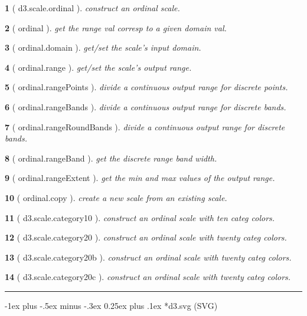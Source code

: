 \documentclass[10pt,landscape,letterpaper]{article}
\makeatletter
\newcounter{thm}
\newcommand{\hdrule}{\vspace{-4pt} \hdashrule[0.25ex]{\fill}{.5pt}{1pt}\vspace{-4pt}}
\theoremstyle{mytheoremstyle}
\newtheorem*{thm}{}
\renewcommand{\section}{\@startsection{section}{1}{0mm}%
                                {-1ex plus -.5ex minus -.3ex}%
                                {0.25ex plus .1ex}%
                                {\normalfont\large\bfseries}}
\makeatother
\begin{document}
\begin{multicols}{3}
\begin{thm} [ d3.scale.ordinal ]  construct an ordinal scale.
\end{thm}\begin{thm} [ ordinal ]  get the range val corresp to a given domain val.
\end{thm}\begin{thm} [ ordinal.domain ]  get/set the scale's input domain.
\end{thm}\begin{thm} [ ordinal.range ]  get/set the scale's output range.
\end{thm}\begin{thm} [ ordinal.rangePoints ]  divide a continuous output range for discrete points.
\end{thm}\begin{thm} [ ordinal.rangeBands ]  divide a continuous output range for discrete bands.
\end{thm}\begin{thm} [ ordinal.rangeRoundBands ]  divide a continuous output range for discrete bands.
\end{thm}\begin{thm} [ ordinal.rangeBand ]  get the discrete range band width.
\end{thm}\begin{thm} [ ordinal.rangeExtent ]  get the min and max values of the output range.
\end{thm}\begin{thm} [ ordinal.copy ]  create a new scale from an existing scale.
\end{thm}\begin{thm} [ d3.scale.category10 ]  construct an ordinal scale with ten categ colors.
\end{thm}\begin{thm} [ d3.scale.category20 ]  construct an ordinal scale with twenty categ colors.
\end{thm}\begin{thm} [ d3.scale.category20b ]  construct an ordinal scale with twenty categ colors.
\end{thm}\begin{thm} [ d3.scale.category20c ]  construct an ordinal scale with twenty categ colors.
\end{thm}
\hrule
\vspace{16pt}
\section*{d3.svg (SVG)}
\hdrule

\end{multicols}
\end{document}

